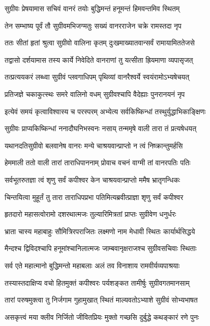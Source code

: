 \twolineshloka
{सुग्रीवः प्रेषयामास सचिवं वानरं तयोः}
{बुद्धिमन्तं हनूमन्तं हिमवन्तमिव स्थितम्}


\twolineshloka
{तेन सम्भाष्य पूर्वं तौ सुग्रीवमभिजग्मतुः}
{सख्यं वानरराजेन चक्रे रामस्तदा नृप}


\twolineshloka
{ततः सीतां हृतां श्रुत्वा सुग्रीवो वालिना कृतम्}
{दुःखमाख्यातवान्सर्वं रामायामिततेजसे}


\twolineshloka
{तद्वासो दर्शयामास तस्य कार्ये निवेदिते}
{वानराणां तु यत्सीता ह्रियमाणा व्यपासृजत्}


\twolineshloka
{तत्प्रत्ययकरं लब्ध्वा सुग्रीवं प्लवगाधिपम्}
{पृथिव्यां वानरैश्वर्ये स्वयंरामोऽभ्यषेचयत्}


\twolineshloka
{प्रतिजज्ञे चकाकुत्स्थः समरे वालिनो वधम्}
{सुग्रीवश्चापि वैदेह्याः पुनरानयनं नृप}


\twolineshloka
{इत्येवं समयं कृत्वाविश्वास्य च परस्परम्}
{अभ्येत्य सर्वकिष्किन्धां तस्थुर्युद्धाभिकाङ्क्षिणः}


\twolineshloka
{सुग्रीवः प्राप्यकिष्किन्धां ननादौघनिभस्वनः}
{नसाय् तन्ममृषे वाली तारा तं प्रत्यषेधयत्}


\twolineshloka
{यथानदतिसुग्रीवो बलवानेष वानरः}
{मन्ये चाश्रयवान्प्राप्तो न त्वं निष्क्रान्तुमर्हसि}


\twolineshloka
{हेममाली ततो वाली तारां ताराधिपाननाम्}
{प्रोवाच वचनं वाग्मी तां वानरपतिः पतिः}


\twolineshloka
{सर्वभूतरुतज्ञा त्वं शृणु सर्वं कपीश्वर}
{केन चाश्रयवान्प्राप्तो ममैष भ्रातृगन्धिकः}

\twolineshloka
{चिन्तयित्वा मुहूर्तं तु तारा ताराधिपप्रभा}
{पतिमित्यब्रवीत्प्राज्ञा शृणु सर्वं कपीश्वर}


\twolineshloka
{हृतदारो महासत्वोरामो दशरथात्मजः}
{तुल्यारिमित्रतां प्राप्तः सुग्रीवेण धनुर्धरः}


\twolineshloka
{भ्राता चास्य महाबाहुः सौमित्रिरपराजितः}
{लक्ष्मणो नाम मेधावी स्थितः कार्यार्थसिद्धये}


\twolineshloka
{मैन्दश्च द्विविदश्चापि हनूमांश्चानिलात्मजः}
{जाम्बवानृक्षराजश्च सुग्रीवसचिवाः स्थिताः}


\twolineshloka
{सर्व एते महात्मानो बुद्धिमन्तो महाबलाः}
{अलं तव विनाशाय रामवीर्यव्यपाश्रयाः}


\twolineshloka
{तस्यास्तदाक्षिप्य वचो हितमुक्तं कपीश्वरः}
{पर्यशङ्कत तामीर्षुः सुग्रीवगतमानसाम्}


\twolineshloka
{तारां परुषमुक्त्वा तु निर्जगाम गुहामुखात्}
{स्थितं माल्यवतोऽभ्याशे सुग्रीवं सोभ्यभाषत}


\twolineshloka
{असकृत्त्वं मया क्लीव निर्जितो जीवितप्रियः}
{मुक्तो गच्छसि दुर्बुद्धे कथङ्कारं रणे पुनः}


